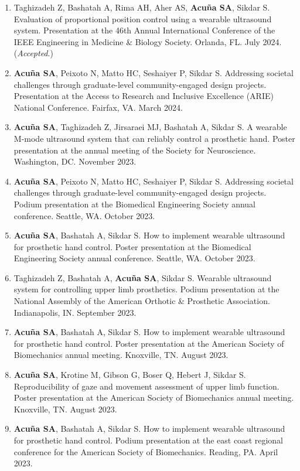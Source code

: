\documentclass[letterpaper, 10pt]{article}
\begin{document}
\begin{enumerate}
    \item Taghizadeh Z, Bashatah A, Rima AH, Aher AS, \textbf{Acuña SA}, Sikdar S. Evaluation of proportional position control using a wearable ultrasound system. Presentation at the 46th Annual International Conference of the IEEE Engineering in Medicine \& Biology Society. Orlanda, FL. July 2024. (\textit{Accepted}.)
    \item \textbf{Acuña SA}, Peixoto N, Matto HC, Seshaiyer P, Sikdar S. Addressing societal challenges through graduate-level community-engaged design projects. Presentation at the Access to Research and Inclusive Excellence (ARIE) National Conference. Fairfax, VA. March 2024.
    \item \textbf{Acuña SA}, Taghizadeh Z, Jirsaraei MJ, Bashatah A, Sikdar S. A wearable M-mode ultrasound system that can reliably control a prosthetic hand. Poster presentation at the annual meeting of the Society for Neuroscience. Washington, DC. November 2023.
    \item \textbf{Acuña SA}, Peixoto N, Matto HC, Seshaiyer P, Sikdar S. Addressing societal challenges through graduate-level community-engaged design projects. Podium presentation at the Biomedical Engineering Society annual conference. Seattle, WA. October 2023.
    \item \textbf{Acuña SA}, Bashatah A, Sikdar S. How to implement wearable ultrasound for prosthetic hand control. Poster presentation at the Biomedical Engineering Society annual conference. Seattle, WA. October 2023.
    \item Taghizadeh Z, Bashatah A, \textbf{Acuña SA}, Sikdar S. Wearable ultrasound system for controlling upper limb prosthetics. Podium presentation at the National Assembly of the American Orthotic \& Prosthetic Association. Indianapolis, IN. September 2023.
    \item \textbf{Acuña SA}, Bashatah A, Sikdar S. How to implement wearable ultrasound for prosthetic hand control. Poster presentation at the American Society of Biomechanics annual meeting. Knoxville, TN. August 2023.
     \item \textbf{Acuña SA}, Krotine M, Gibson G, Boser Q, Hebert J, Sikdar S. Reproducibility of gaze and movement assessment of upper limb function. Poster presentation at the American Society of Biomechanics annual meeting. Knoxville, TN. August 2023.
    \item \textbf{Acuña SA}, Bashatah A, Sikdar S. How to implement wearable ultrasound for prosthetic hand control. Podium presentation at the east coast regional conference for the American Society of Biomechanics. Reading, PA. April 2023.

\end{enumerate}
\end{document}
